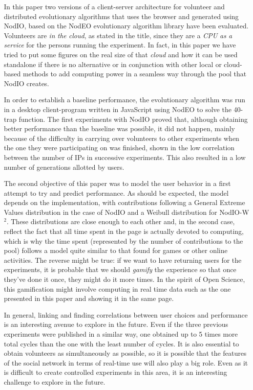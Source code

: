 \documentclass[letterpaper]{article}
\begin{document}
In this paper two versions of a client-server architecture for volunteer and distributed
evolutionary algorithms that uses the browser and generated using {\sf
  NodIO}, based on the {\sf NodEO} evolutionary algorithm library have been
evaluated. Volunteers are {\em in the cloud}, as stated in the title,
since they are a {\em CPU as a service} for the persons running the
experiment. In fact, in this paper we have tried to put some figures
on the real size of that {\em cloud} and how it can be used standalone
if there is no alternative or in conjunction with other local or
cloud-based methods to add computing power in a seamless way through
the pool that NodIO creates. 

In order to establish a baseline performance, the evolutionary
algorithm was run in a desktop client-program written in JavaScript
using NodEO to solve the 40-trap function. The first experiments with
{\sf NodIO} proved that, although obtaining better performance than the
baseline was possible, it did not happen, mainly because of the
difficulty in carrying over volunteers to other experiments when the
one they were participating on was finished, shown in the low
correlation between the number of IPs in successive experiments. This
also resulted in a low number of generations allotted by users. 


The second objective of this paper was to model the user behavior in a
first attempt to try and predict performance. As should be expected,
the model depends on the implementation, with contributions following
a General Extreme Values distribution in the case of {\sf NodIO} and a
Weibull distribution for {\sf NodIO-W$^2$}. These distributions are
close enough to each other and, in the second case, reflect the fact
that all time spent in the page is actually devoted to computing,
which is why the time spent (represented by the number of
contributions to the pool) follows a model quite similar to that found
for games or other online activities. The reverse might be true: if we
want to have returning users for the experiments, it is probable that
we should {\em gamify} the experience so that once they've done it
once, they might do it more times. In the spirit of Open Science, this
gamification might involve computing in real time data such as the one
presented in this paper and showing it in the same page. 

In general, linking and finding correlations between user choices and
performance is an interesting avenue to explore in the future. Even if
the three previous experiments were published in a similar way, one
obtained up to 5 times more total cycles  than the one with the least
number of cycles. It is also essential to obtain volunteers as
simultaneously as possible, so it is possible that the features of the
social network in terms of real-time use will also play a big
role. Even as it is difficult to create controlled experiments in this
area, it is an interesting challenge to explore in the future.
\end{document}
